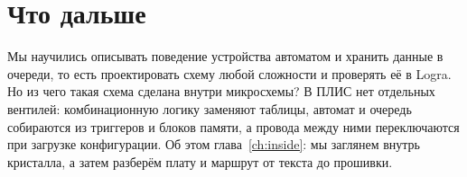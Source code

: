 \section{Что дальше}

Мы научились описывать поведение устройства автоматом и хранить данные в
очереди, то есть проектировать схему любой сложности и проверять её в Logra. Но
из чего такая схема сделана внутри микросхемы? В ПЛИС нет отдельных вентилей:
комбинационную логику заменяют таблицы, автомат и очередь собираются из
триггеров и блоков памяти, а провода между ними переключаются при загрузке
конфигурации. Об этом глава~\ref{ch:inside}: мы заглянем внутрь кристалла, а
затем разберём плату и маршрут от текста до прошивки.
